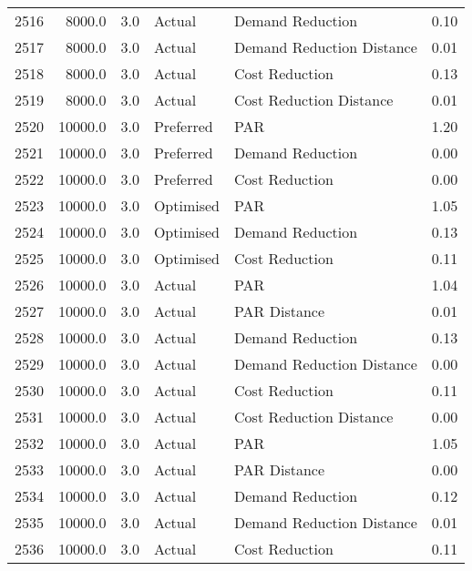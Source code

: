 \begin{longtable}{lrrllr}
2516 &       8000.0 &     3.0 &         Actual &           Demand Reduction &   0.10 \\
2517 &       8000.0 &     3.0 &         Actual &  Demand Reduction Distance &   0.01 \\
2518 &       8000.0 &     3.0 &         Actual &             Cost Reduction &   0.13 \\
2519 &       8000.0 &     3.0 &         Actual &    Cost Reduction Distance &   0.01 \\
2520 &      10000.0 &     3.0 &      Preferred &                        PAR &   1.20 \\
2521 &      10000.0 &     3.0 &      Preferred &           Demand Reduction &   0.00 \\
2522 &      10000.0 &     3.0 &      Preferred &             Cost Reduction &   0.00 \\
2523 &      10000.0 &     3.0 &      Optimised &                        PAR &   1.05 \\
2524 &      10000.0 &     3.0 &      Optimised &           Demand Reduction &   0.13 \\
2525 &      10000.0 &     3.0 &      Optimised &             Cost Reduction &   0.11 \\
2526 &      10000.0 &     3.0 &         Actual &                        PAR &   1.04 \\
2527 &      10000.0 &     3.0 &         Actual &               PAR Distance &   0.01 \\
2528 &      10000.0 &     3.0 &         Actual &           Demand Reduction &   0.13 \\
2529 &      10000.0 &     3.0 &         Actual &  Demand Reduction Distance &   0.00 \\
2530 &      10000.0 &     3.0 &         Actual &             Cost Reduction &   0.11 \\
2531 &      10000.0 &     3.0 &         Actual &    Cost Reduction Distance &   0.00 \\
2532 &      10000.0 &     3.0 &         Actual &                        PAR &   1.05 \\
2533 &      10000.0 &     3.0 &         Actual &               PAR Distance &   0.00 \\
2534 &      10000.0 &     3.0 &         Actual &           Demand Reduction &   0.12 \\
2535 &      10000.0 &     3.0 &         Actual &  Demand Reduction Distance &   0.01 \\
2536 &      10000.0 &     3.0 &         Actual &             Cost Reduction &   0.11 \\

\end{longtable}
